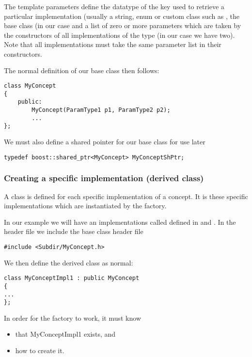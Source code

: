The template parameters define the datatype of the key used to retrieve a
particular implementation (usually a string, enum or custom class such as
, the base class (in our case  and a list
of zero or more parameters which are taken by the constructors of all
implementations of the type  (in our case we have two). Note
that all implementations must take the same parameter list in their constructors.

The normal definition of our base class then follows:

\begin{lstlisting}[style=C++Style]
class MyConcept 
{
    public:
        MyConcept(ParamType1 p1, ParamType2 p2);
        ...
};
\end{lstlisting}

We must also define a shared pointer for our base class for use later
\begin{lstlisting}[style=C++Style]
typedef boost::shared_ptr<MyConcept> MyConceptShPtr;
\end{lstlisting}

\subsubsection{Creating a specific implementation (derived class)}
A class is defined for each specific implementation of a concept. It is these
specific implementations which are instantiated by the factory.

In our example we will have an implementations called 
defined in  and . In the
header file we include the base class header file

\begin{lstlisting}[style=C++Style]
#include <Subdir/MyConcept.h>
\end{lstlisting}

We then define the derived class as normal:

\begin{lstlisting}[style=C++Style]
class MyConceptImpl1 : public MyConcept
{
...
};
\end{lstlisting}

In order for the factory to work, it must know
\begin{itemize}
\item that {{{MyConceptImpl1}}} exists, and
\item how to create it.
\end{itemize}

